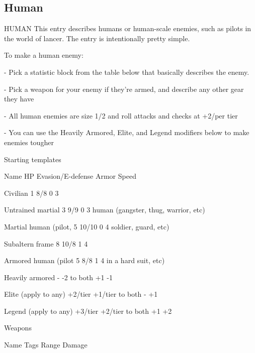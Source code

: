 \subsection{Human}
                                                HUMAN
This entry describes humans or human-scale enemies, such as pilots in the world of lancer. The
entry is intentionally pretty simple.


To make a human enemy:

            -   Pick a statistic block from the table below that basically describes the enemy.

            -   Pick a weapon for your enemy if they're armed, and describe any other gear they
                have

            -   All human enemies are size 1/2 and roll attacks and checks at +2/per tier

            -   You can use the Heavily Armored, Elite, and Legend modifiers below to make
                enemies tougher


                                           Starting templates

 Name                        HP         Evasion/E-defense            Armor                   Speed

 Civilian                    1          8/8                          0                       3

 Untrained martial           3          9/9                          0                       3
 human (gangster, thug,
 warrior, etc)

 Martial human (pilot,       5          10/10                        0                       4
 soldier, guard, etc)

 Subaltern frame             8          10/8                         1                       4

 Armored human (pilot        5          8/8                          1                       4
 in a hard suit, etc)

 Heavily armored             -          -2 to both                   +1                      -1

 Elite (apply to any)        +2/tier    +1/tier to both              -                       +1

 Legend (apply to any)       +3/tier    +2/tier to both              +1                      +2

                                                Weapons

 Name                        Tags                          Range                    Damage


